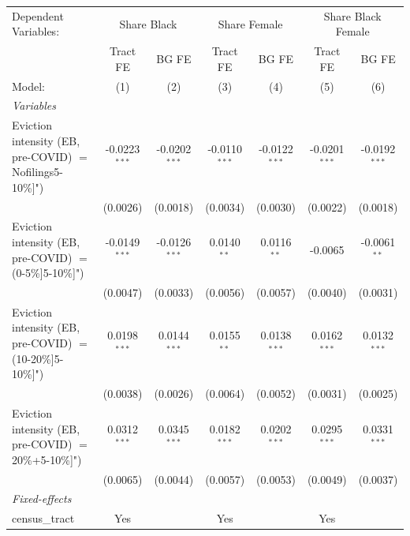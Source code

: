 \begingroup
\centering
\begin{tabular}{lcccccc}
   \tabularnewline \midrule \midrule
   Dependent Variables: & \multicolumn{2}{c}{Share Black} & \multicolumn{2}{c}{Share Female} & \multicolumn{2}{c}{Share Black Female}\\
                                                               & Tract FE        & BG FE           & Tract FE        & BG FE           & Tract FE        & BG FE \\   
   Model:                                                      & (1)             & (2)             & (3)             & (4)             & (5)             & (6)\\  
   \midrule
   \emph{Variables}\\
   Eviction intensity (EB, pre-COVID) $=$ Nofilings5-10\%]")   & -0.0223$^{***}$ & -0.0202$^{***}$ & -0.0110$^{***}$ & -0.0122$^{***}$ & -0.0201$^{***}$ & -0.0192$^{***}$\\   
                                                               & (0.0026)        & (0.0018)        & (0.0034)        & (0.0030)        & (0.0022)        & (0.0018)\\   
   Eviction intensity (EB, pre-COVID) $=$ (0-5\%]5-10\%]")     & -0.0149$^{***}$ & -0.0126$^{***}$ & 0.0140$^{**}$   & 0.0116$^{**}$   & -0.0065         & -0.0061$^{**}$\\   
                                                               & (0.0047)        & (0.0033)        & (0.0056)        & (0.0057)        & (0.0040)        & (0.0031)\\   
   Eviction intensity (EB, pre-COVID) $=$ (10-20\%]5-10\%]")   & 0.0198$^{***}$  & 0.0144$^{***}$  & 0.0155$^{**}$   & 0.0138$^{***}$  & 0.0162$^{***}$  & 0.0132$^{***}$\\   
                                                               & (0.0038)        & (0.0026)        & (0.0064)        & (0.0052)        & (0.0031)        & (0.0025)\\   
   Eviction intensity (EB, pre-COVID) $=$ 20\%+5-10\%]")       & 0.0312$^{***}$  & 0.0345$^{***}$  & 0.0182$^{***}$  & 0.0202$^{***}$  & 0.0295$^{***}$  & 0.0331$^{***}$\\   
                                                               & (0.0065)        & (0.0044)        & (0.0057)        & (0.0053)        & (0.0049)        & (0.0037)\\   
   \midrule
   \emph{Fixed-effects}\\
   census\_tract                                               & Yes             &                 & Yes             &                 & Yes             & \\  

\end{tabular}
